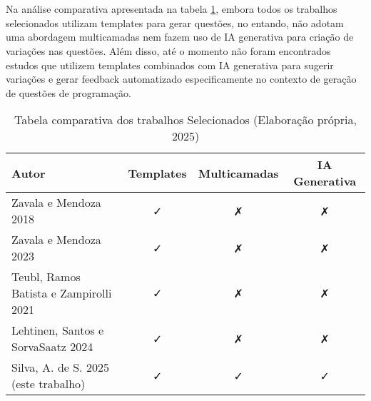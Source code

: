 \section{}

Na análise comparativa apresentada na tabela \ref{tab:table-comparativa-trabalhos-selecionados}, embora todos os trabalhos selecionados utilizam templates para gerar questões, no entando, não adotam uma abordagem multicamadas nem fazem uso de IA generativa para criação de variações nas questões. Além disso, até o momento não foram encontrados estudos que utilizem templates combinados com IA generativa para sugerir variações e gerar feedback automatizado especificamente no contexto de geração de questões de programação. 

\begin{table}[htbp]
    \centering
    \begin{tabular}{|l|c|c|c|}
        \hline
        Autor& Templates & Multicamadas & IA Generativa \\ \hline
        Zavala e Mendoza 2018& \faCheck & \faClose& \faClose\\ \hline 
        Zavala e Mendoza 2023 & \faCheck&  \faClose& \faClose\\ \hline
        Teubl, Ramos Batista e Zampirolli 2021 & \faCheck& \faClose& \faClose\\\hline
        Lehtinen, Santos e SorvaSaatz 2024 & \faCheck & \faClose&\faClose \\\hline
        Silva, A. de S. 2025 (este trabalho)& \faCheck & \faCheck&\faCheck \\\hline
    \end{tabular}
    \caption{Tabela comparativa dos trabalhos Selecionados (Elaboração própria, 2025)}
    \label{tab:table-comparativa-trabalhos-selecionados}
\end{table}


